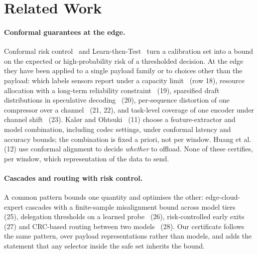 \section{Related Work}
\label{sec:related}

\paragraph{Conformal guarantees at the edge.} Conformal risk control~\cite{angelopoulos2024crc}
and Learn-then-Test~\cite{angelopoulos2021ltt} turn a calibration set into a bound on the expected
or high-probability risk of a thresholded decision. At the edge they have been applied to a single
payload family or to choices other than the payload: which labels sensors report under a capacity
limit~\cite{zhu2024cdcrc} (row 18), resource allocation with a long-term reliability
constraint~\cite{binucci2025clo} (19), sparsified draft distributions in speculative
decoding~\cite{bhattacharjee2025csqs} (20), per-sequence distortion of one compressor over a
channel~\cite{ganesan2025occ,zecchin2025ppc} (21, 22), and task-level coverage of one encoder under
channel shift~\cite{batra2026wcsc} (23). Kalør and Ohtsuki~\cite{kalor2025blackbox} (11) choose a
feature-extractor and model combination, including codec settings, under conformal latency and
accuracy bounds; the combination is fixed a priori, not per window. Huang et
al.~\cite{huang2025cascades} (12) use conformal alignment to decide \emph{whether} to offload.
None of these certifies, per window, which representation of the data to send.

\paragraph{Cascades and routing with risk control.} A common pattern bounds one quantity and
optimises the other: edge-cloud-expert cascades with a finite-sample misalignment bound across
model tiers~\cite{hou2025cascades} (25), delegation thresholds on a learned
probe~\cite{pona2026ctd} (26), risk-controlled early exits~\cite{jazbec2024fastsafe} (27) and
CRC-based routing between two models~\cite{overman2025arbitrage} (28). Our certificate follows the
same pattern, over payload representations rather than models, and adds the statement that any
selector inside the safe set inherits the bound.

